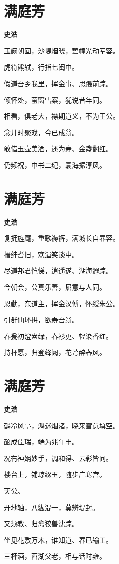 \documentclass[12pt,a4paper]{ctexbook}
\begin{document}
\section{满庭芳}
\textbf{史浩}\par\vspace{0.5em}
玉阙朝回，沙堤烟晓，碧幢光动军容。\par
虎符熊轼，行指七闽中。\par
假道吾乡我里，挥金事、思蹑前踪。\par
倾怀处，萤窗雪案，犹说昔年同。\par
相看，俱老大，襟期道义，不为王公。\par
念儿时聚戏，今已成翁。\par
敢借玉壶美酒，还为寿、金盏翻红。\par
仍频祝，中书二纪，寰海振淳风。\par

\section{满庭芳}
\textbf{史浩}\par\vspace{0.5em}
复拥旌麾，重歌褥裤，满城长自春容。\par
搢绅耆旧，欢溢笑谈中。\par
尽道邦君恺悌，逍遥遂、湖海遐踪。\par
今朝会，公真乐善，屈意与人同。\par
恩勤，东道主，挥金汉傅，怀绶朱公。\par
引群仙环拱，欲寿吾翁。\par
春瓮初澄盎绿，春衫更、轻染香红。\par
持杯愿，归登绛阙，花萼醉春风。\par

\section{满庭芳}
\textbf{史浩}\par\vspace{0.5em}
鹤冷风亭，鸿迷烟渚，晓来雪意填空。\par
酿成佳瑞，端为兆年丰。\par
况有神娲妙手，调和得、云彩皆同。\par
楼台上，铺琼缀玉，随步广寒宫。\par
天公。\par
开地轴，八紘混一，莫辨堤封。\par
又须教、归禽狡兽沈踪。\par
坐见花敷万木，谁知道、春已输工。\par
三杯酒，西湖父老，相与话时雍。\par
\end{document}
